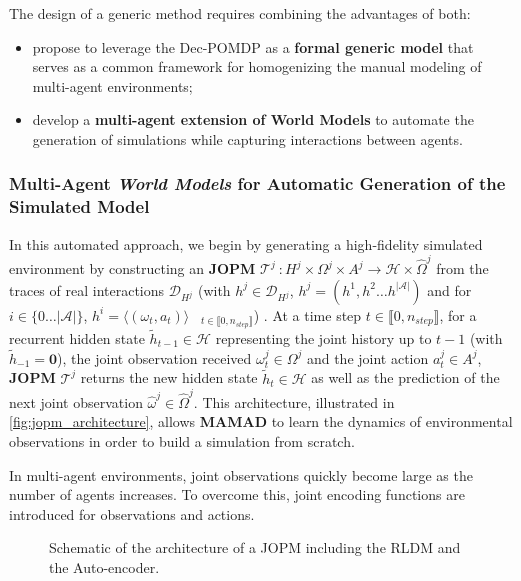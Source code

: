 \documentclass[pdflatex,sn-mathphys-num]{sn-jnl}%
\theoremstyle{thmstyleone}%
\theoremstyle{thmstyletwo}%
\theoremstyle{thmstylethree}%
\begin{document}
The design of a generic method requires combining the advantages of both:
\begin{itemize}
    \item propose to leverage the Dec-POMDP as a \textbf{formal generic model} that serves as a common framework for homogenizing the manual modeling of multi-agent environments;
    \item develop a \textbf{multi-agent extension of World Models} to automate the generation of simulations while capturing interactions between agents.
\end{itemize}


\subsubsection*{Multi-Agent \textit{World Models} for Automatic Generation of the Simulated Model}

In this automated approach, we begin by generating a high-fidelity simulated environment by constructing an \textbf{JOPM} $\mathcal{T}^j~: H^j \times \Omega^j \times A^j \rightarrow \mathcal{H} \times \hat{\Omega}^j$ from the traces of real interactions $\mathcal{D}_{H^j}$ (with $h^j \in \mathcal{D}_{H^j}$, $h^j = (h^1, h^2 \dots h^{|\mathcal{A}|})$ and for $i \in \{0\dots|\mathcal{A}|\}$, $h^i = \langle (\omega_t, a_t) \rangle\phantom{X}_{t \in \llbracket 0, n_{step} \rrbracket}$) . At a time step $t \in \llbracket 0, n_{step} \rrbracket$, for a recurrent hidden state $\tilde{h}_{t-1} \in \mathcal{H}$ representing the joint history up to $t-1$ (with $\tilde{h}_{-1} = \mathbf{0}$), the joint observation received $\omega_t^j \in \Omega^j$ and the joint action $a_t^j \in A^j$, \textbf{JOPM} $\mathcal{T}^j$ returns the new hidden state $\tilde{h}_t \in \mathcal{H}$ as well as the prediction of the next joint observation $\hat{\omega}^j \in \hat {\Omega}^j$. This architecture, illustrated in \autoref{fig:jopm_architecture}, allows \textbf{MAMAD} to learn the dynamics of environmental observations in order to build a simulation from scratch.

In multi-agent environments, joint observations quickly become large as the number of agents increases. To overcome this, joint encoding functions are introduced for observations and actions.

\begin{figure}[h]
    \centering
    \resizebox{\textwidth}{!}{%
        
    }
    \caption{Schematic of the architecture of a JOPM including the RLDM and the Auto-encoder.}
    \label{fig:jopm_architecture}
\end{figure}
\end{document}
